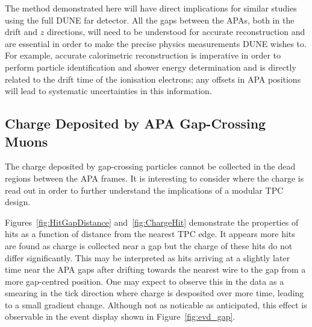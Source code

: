 The method demonstrated here will have direct implications for similar studies using the full DUNE far detector.  All the gaps between the APAs, both in the drift and $z$ directions, will need to be understood for accurate reconstruction and are essential in order to make the precise physics measurements DUNE wishes to.  For example, accurate calorimetric reconstruction is imperative in order to perform particle identification and shower energy determination and is directly related to the drift time of the ionisation electrons; any offsets in APA positions will lead to systematic uncertainties in this information.

\subsection{Charge Deposited by APA Gap-Crossing Muons}\label{sec:APAGapCharge}

The charge deposited by gap-crossing particles cannot be collected in the dead regions between the APA frames.  It is interesting to consider where the charge is read out in order to further understand the implications of a modular TPC design.

Figures~\ref{fig:HitGapDistance} and~\ref{fig:ChargeHit} demonstrate the properties of hits as a function of distance from the nearest TPC edge.  It appears more hits are found as charge is collected near a gap but the charge of these hits do not differ significantly.  This may be interpreted as hits arriving at a slightly later time near the APA gaps after drifting towards the nearest wire to the gap from a more gap-centred position.  One may expect to observe this in the data as a smearing in the tick direction where charge is desposited over more time, leading to a small gradient change.  Although not as noticable as anticipated, this effect is observable in the event display shown in Figure~\ref{fig:evd_gap}.

